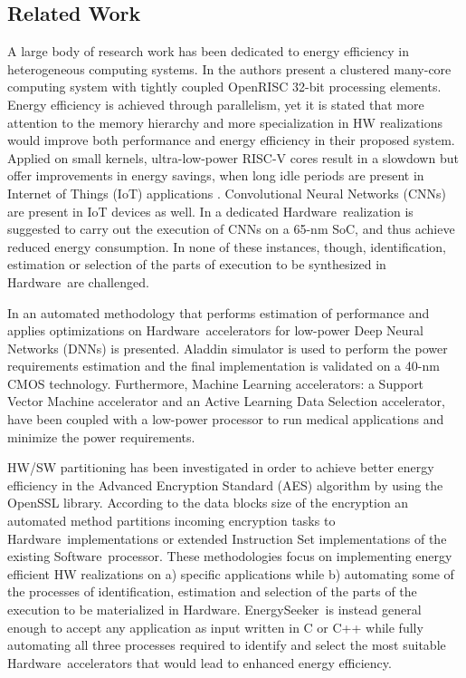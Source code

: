 \documentclass[]{usiinfthesis}
\newcommand{\eseeker}{{EnergySeeker}}
\newcommand{\HW}{{Hardware}}
\newcommand{\SW}{{Software}}
\begin{document}
\subsection{Related Work}

A large body of research work has been dedicated to energy efficiency in heterogeneous computing
systems. In \cite{MelpignanoJune12} \cite{ContiSep16} the authors present a clustered many-core 
computing system with tightly coupled OpenRISC 32-bit processing elements. Energy efficiency is 
achieved through parallelism, yet it is stated that more attention to the memory hierarchy and 
more specialization in HW realizations would improve both performance and energy efficiency in 
their proposed system. Applied on small kernels, ultra-low-power RISC-V cores result in a slowdown 
but offer improvements in energy savings, when long idle periods are present in Internet of 
Things (IoT) applications \cite{SchiavoneSep17}. Convolutional Neural Networks (CNNs) are 
present in IoT devices as well. In \cite{PulliniJan17} a dedicated \HW\ realization is 
suggested to carry out the execution of CNNs on a 65-nm SoC, and thus achieve reduced energy
consumption. In none of these instances, though, identification, estimation or selection of
the parts of execution to be synthesized in \HW\ are challenged.\par

In \cite{ReagenJun16} an automated methodology that performs estimation of performance and 
applies optimizations on \HW\ accelerators for low-power Deep Neural Networks (DNNs) is presented. 
Aladdin simulator \cite{ShaoJul14} is used to perform the power requirements estimation and the 
final implementation is validated on a 40-nm CMOS technology. Furthermore, Machine Learning 
accelerators: a Support Vector Machine accelerator and an Active Learning Data Selection 
accelerator, have been coupled with a low-power processor \cite{LeeApr13} to run medical
applications and minimize the power requirements.\par

HW/SW partitioning has been investigated \cite{XiaoMay18} in order to achieve better 
energy efficiency in the Advanced Encryption Standard (AES) algorithm by using the OpenSSL 
\cite{OpensslDec98} library. According to the data blocks size of the encryption an automated 
method partitions incoming encryption tasks to \HW\ implementations or extended Instruction Set 
implementations of the existing \SW\ processor. These methodologies focus on implementing 
energy efficient HW realizations on a) specific applications while b) automating some of the 
processes of identification, estimation and selection of the parts of the execution to be 
materialized in \HW. \eseeker\ is instead general enough to accept any application as 
input written in C or C++ while fully automating all three processes required to identify and 
select the most suitable \HW\ accelerators that would lead to enhanced energy efficiency.\par
\end{document}
